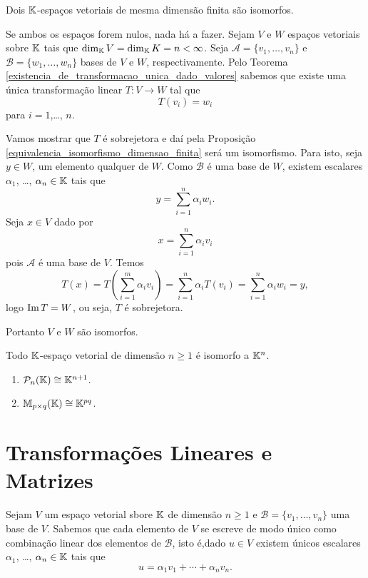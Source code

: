 \begin{teorema}\label{teorema_espacos_isomorfos}
	Dois $\mathbb{K}$-espaços vetoriais de mesma dimensão finita são isomorfos.
\end{teorema}
\begin{prova}
	Se ambos os espaços forem nulos, nada há a fazer. Sejam $V$ e $W$ espaços vetoriais sobre $\mathbb{K}$ tais que $\dim_{\mathbb{K}}V = \dim_{\mathbb{K}}K = n < \infty$. Seja $\mathcal{A} = \{v_1,\dots,v_n\}$ e $\mathcal{B} = \{w_1,\dots,w_n\}$ bases de $V$ e $W$, respectivamente. Pelo Teorema \ref{existencia_de_transformacao_unica_dado_valores} sabemos que existe uma única transformação linear $T : V \to W$ tal que
	\[
		T(v_i) = w_i
	\]
	para $i=1$,\dots, $n$.

	Vamos mostrar que $T$ é sobrejetora e daí pela Proposição \ref{equivalencia_isomorfismo_dimensao_finita} será um isomorfismo. Para isto, seja $y \in W$, um elemento qualquer de $W$. Como $\mathcal{B}$ é uma base de $W$, existem escalares $\alpha_1$, \dots, $\alpha_n \in \mathbb{K}$ tais que
	\[
		y = \sum_{i=1}^n\alpha_iw_i.
	\]
	Seja $x \in V$ dado por
	\[
		x = \sum_{i=1}^n\alpha_iv_i
	\]
	pois $\mathcal{A}$ é uma base de $V$. Temos
	\[
		T(x) = T(\sum_{i=1}^m\alpha_iv_i) = \sum_{i=1}^n\alpha_iT(v_i) = \sum_{i=1}^n\alpha_iw_i = y,
	\]
	logo ${\rm Im\,} T = W$, ou seja, $T$ é sobrejetora.

	Portanto $V$ e $W$ são isomorfos.
\end{prova}

\begin{corolario}
	Todo $\mathbb{K}$-espaço vetorial de dimensão $n \ge 1$ é isomorfo a $\mathbb{K}^n$.
\end{corolario}

\begin{exemplos}
	\begin{enumerate}
		\item $\mathcal{P}_n(\mathbb{K}) \cong \mathbb{K}^{n+1}$.
		\item $\mathbb{M}_{p\times q}(\mathbb{K}) \cong \mathbb{K}^{pq}$.
	\end{enumerate}
\end{exemplos}

\section{Transformações Lineares e Matrizes} %
\label{sec:transformacoes_lineares_e_matrizes}

Sejam $V$ um espaço vetorial sbore $\mathbb{K}$ de dimensão $n \ge 1$ e $\mathcal{B} = \{v_1,\dots,v_n\}$ uma base de $V$. Sabemos que cada elemento de $V$ se escreve de modo único como combinação linear dos elementos de $\mathcal{B}$, isto é,dado $u \in V$ existem únicos escalares $\alpha_1$, \dots, $\alpha_n \in \mathbb{K}$ tais que
\[
	u = \alpha_1v_1 + \cdots + \alpha_nv_n.
\]

